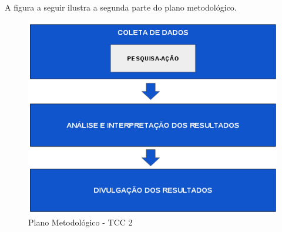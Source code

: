 A figura a seguir ilustra a segunda parte do plano metodológico.

\begin{figure}[h]
\includegraphics[width=\textwidth]{figuras/planometodologico2.png}
\caption{Plano Metodológico - TCC 2}
\end{figure}